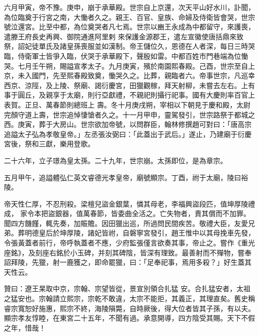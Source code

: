 \begin{pinyinscope}
 六月甲寅，帝不豫。庚申，崩于承華殿。世宗自上京還，次天平山好水川，訃聞，為位臨奠于行宮之南，大慟者久之。親王、百官、皇族、命婦及侍衛皆會哭，世宗號泣還宮。比至中都，為位奠哭者凡七焉。世宗以豳王永成為中都留守，來護喪，遣滕王府長史再興、御院通進阿里剌
 來保護金源郡王，遣左宣徽使唐括鼎來致祭，詔妃徒單氏及諸皇孫喪服並如漢制。帝王儲位久，恩德在人者深，每日三時哭臨，侍衛軍士皆爭入臨，伏哭于承華殿下，聲殷如雷。中都百姓市門巷端為位慟哭。七月壬午朔，賜謚宣孝太子。九月庚寅，殯於南園熙春殿。己酉，世宗至自上京，未入國門，先至熙春殿致奠，慟哭久之。比葬，親臨者六。帝事世宗，凡巡幸西京、涼陘，及上陵、祭廟、謁衍慶宮，田獵觀稼，拜天射柳，未嘗去左右。上有事于圓丘，及親享于太廟，則行亞獻禮，不親祀則攝行祀事。國有大慶則率百官上表賀。正旦、萬春節則總班上
 壽。冬十月庚戌朔，宰相以下朝見于慶和殿，太尉完顏守道上壽，世宗追悼悽愴者久之。十一月甲申，靈駕發引，世宗路祭于都城之西。庚寅，葬于大房山。世宗欲加帝號，以問群臣，翰林修撰趙可對曰：「唐高宗追謚太子弘為孝敬皇帝。」左丞張汝弼曰：「此蓋出于武后。」遂止，乃建廟于衍慶宮後，祭和三獻，樂用登歌。



 二十六年，立子璟為皇太孫。二十九年，世宗崩。太孫即位，是為章宗。



 五月甲午，追謚體弘仁英文睿德光孝皇帝，廟號顯宗。丁酉，祔于太廟，陵曰裕陵。



 帝天性仁厚，不忍刑殺。梁檀兒盜金銀葉，憐其母老，李福興盜段匹，值坤厚陵禮成，
 家令本把盜銀器，值萬春節，皆委曲全活之。亡失物者，責其償而不加罪。聞四方饑饉，輒先奏，加賑贍。因田獵出巡，所過問民間疾苦。敬禮大臣，友愛兄弟。葬明德皇后於坤厚陵，諸妃皆祔，自磐寧宮發引，趙王惟中以其母挽車先發，令張黃蓋者前行，帝呼執蓋者不應，少府監張僅言欲奏其事，帝止之。嘗作《重光座銘》，及刻座右銘於小玉碑，并刻其碑陰，皆深有理致。最善射而不殫物，嘗奉詔拜陵，先獵，射一鹿獲之，即命罷獵，曰：「足奉祀事，焉用多殺？」好生蓋其天性云。



 贊曰：遼王杲取中京，宗翰、宗望皆從，景宣別領合扎猛
 安。合扎猛安者，太祖之猛安也。宗翰請立熙宗，宗乾不敢違，太宗不能拒，其義正，其理直矣。舊史稱睿宗寬恕好施惠，熙宗不終，海陵隕斃，自時厥後，得大位者皆其子孫，有以夫。顯宗孝友惇睦，在東宮二十五年，不聞有過。承意開導，四方陰受其賜。天下不假之年，惜哉！



\end{pinyinscope}